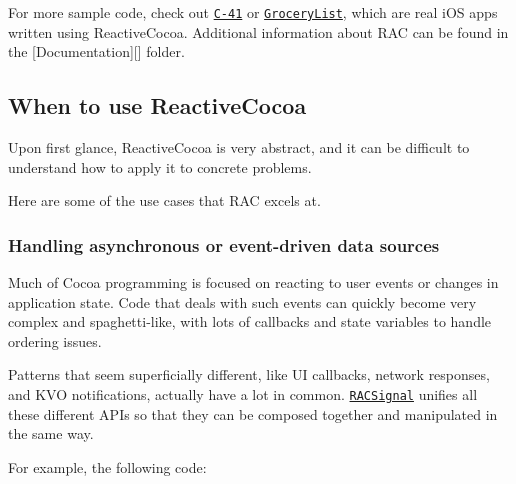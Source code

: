 For more sample code, check out \href{https://github.com/AshFurrow/C-41}{\tt C-\/41} or \href{https://github.com/jspahrsummers/GroceryList}{\tt Grocery\+List}, which are real i\+OS apps written using Reactive\+Cocoa. Additional information about R\+AC can be found in the \mbox{[}Documentation\mbox{]}\mbox{[}\mbox{]} folder.

\subsection*{When to use Reactive\+Cocoa}

Upon first glance, Reactive\+Cocoa is very abstract, and it can be difficult to understand how to apply it to concrete problems.

Here are some of the use cases that R\+AC excels at.

\subsubsection*{Handling asynchronous or event-\/driven data sources}

Much of Cocoa programming is focused on reacting to user events or changes in application state. Code that deals with such events can quickly become very complex and spaghetti-\/like, with lots of callbacks and state variables to handle ordering issues.

Patterns that seem superficially different, like UI callbacks, network responses, and K\+VO notifications, actually have a lot in common. \href{ReactiveCocoa/RACSignal.h}{\tt R\+A\+C\+Signal} unifies all these different A\+P\+Is so that they can be composed together and manipulated in the same way.

For example, the following code\+:


